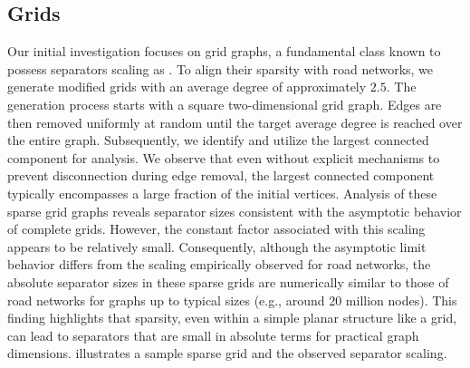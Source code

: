 \subsection{Grids}
\label{sec:synthetic:grid}

Our initial investigation focuses on grid graphs, a fundamental class known to possess separators scaling as .
To align their sparsity with road networks, we generate modified grids with an average degree of approximately \(2.5\).
The generation process starts with a square two-dimensional grid graph.
Edges are then removed uniformly at random until the target average degree is reached over the entire graph.
Subsequently, we identify and utilize the largest connected component for analysis.
We observe that even without explicit mechanisms to prevent disconnection during edge removal, the largest connected component typically encompasses a large fraction of the initial vertices.
Analysis of these sparse grid graphs reveals separator sizes consistent with the  asymptotic behavior of complete grids.
However, the constant factor associated with this scaling appears to be relatively small.
Consequently, although the asymptotic limit behavior differs from the  scaling empirically observed for road networks, the absolute separator sizes in these sparse grids are numerically similar to those of road networks for graphs up to typical sizes (e.g., around 20 million nodes).
This finding highlights that sparsity, even within a simple planar structure like a grid, can lead to separators that are small in absolute terms for practical graph dimensions.
 illustrates a sample sparse grid and the observed separator scaling.

